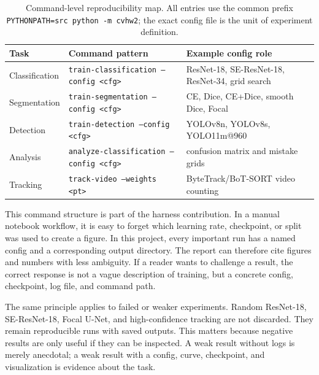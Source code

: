 \documentclass[10pt,twocolumn]{article}
\begin{document}
\begin{table}[!htbp]
\centering
\caption{Command-level reproducibility map. All entries use the common prefix \texttt{PYTHONPATH=src python -m cvhw2}; the exact config file is the unit of experiment definition.}
\label{tab:appendix_commands}
\begin{tabular}{p{}p{}p{}}
\toprule
Task & Command pattern & Example config role\\
\midrule
Classification & \texttt{train-classification --config <cfg>} & ResNet-18, SE-ResNet-18, ResNet-34, grid search\\
Segmentation & \texttt{train-segmentation --config <cfg>} & CE, Dice, CE+Dice, smooth Dice, Focal\\
Detection & \texttt{train-detection --config <cfg>} & YOLOv8n, YOLOv8s, YOLO11m@960\\
Analysis & \texttt{analyze-classification --config <cfg>} & confusion matrix and mistake grids\\
Tracking & \texttt{track-video --weights <pt>} & ByteTrack/BoT-SORT video counting\\
\bottomrule
\end{tabular}
\end{table}

This command structure is part of the harness contribution. In a manual notebook workflow, it is easy to forget which learning rate, checkpoint, or split was used to create a figure. In this project, every important run has a named config and a corresponding output directory. The report can therefore cite figures and numbers with less ambiguity. If a reader wants to challenge a result, the correct response is not a vague description of training, but a concrete config, checkpoint, log file, and command path.

The same principle applies to failed or weaker experiments. Random ResNet-18, SE-ResNet-18, Focal U-Net, and high-confidence tracking are not discarded. They remain reproducible runs with saved outputs. This matters because negative results are only useful if they can be inspected. A weak result without logs is merely anecdotal; a weak result with a config, curve, checkpoint, and visualization is evidence about the task.
\end{document}
